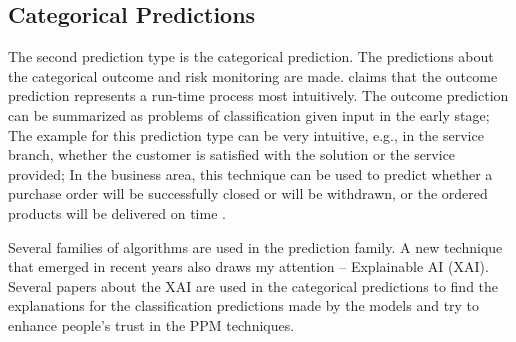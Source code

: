 \documentclass[runningheads]{llncs}
\begin{document}
		\subsection{Categorical Predictions}
		The second prediction type is the categorical prediction. The predictions about the categorical outcome and risk monitoring are made. \cite{art-9} claims that the outcome prediction represents a run-time process most intuitively. The outcome prediction can be summarized as problems of classification given input in the early stage; The example for this prediction type can be very intuitive, e.g., in the service branch, whether the customer is satisfied with the solution or the service provided; In the business area, this technique can be used to predict whether a purchase order will be successfully closed or will be withdrawn, or the ordered products will be delivered on time \cite{art-12}.
	
		Several families of algorithms are used in the prediction family. A new technique that emerged in recent years also draws my attention -- Explainable AI (XAI). Several papers about the XAI are used in the categorical predictions to find the explanations for the classification predictions made by the models and try to enhance people's trust in the PPM techniques. 
		
\end{document}
